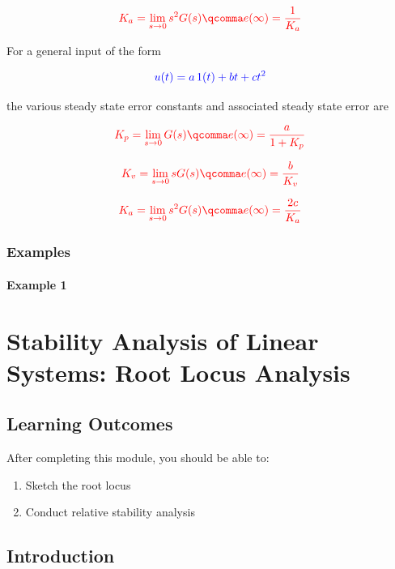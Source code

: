 \documentclass[
  14pt,
  a4paper,
  oneside,
  open=any,
  a4paper,
  14pt]{report}
\begin{document}
\[
    \textcolor{red}{K_a = \lim_{s \to 0} s^2G(s)\qcomma e(\infty) = \dfrac{1}{K_a}}
\]

For a general input of the form

\[
    \textcolor{blue}{u(t) = a\, 1(t) + bt + ct^2}
\]

the various steady state error constants and associated steady state
error are

\[
    \textcolor{red}{K_p = \lim_{s \to 0} G(s)\qcomma e(\infty) = \dfrac{a}{1+K_p}}
\]

\[
    \textcolor{red}{K_v = \lim_{s \to 0} sG(s)\qcomma e(\infty) = \dfrac{b}{K_v}}
\]

\[
    \textcolor{red}{K_a = \lim_{s \to 0} s^2G(s)\qcomma e(\infty) = \dfrac{2c}{K_a}}
\]

\subsection{Examples}\label{examples-1}

\subsubsection{Example 1}\label{example-1-4}

\chapter{Stability Analysis of Linear Systems: Root Locus
Analysis}\label{stability-analysis-of-linear-systems-root-locus-analysis}

\section*{Learning Outcomes}\label{learning-outcomes-6}


After completing this module, you should be able to:

\begin{enumerate}
\def\labelenumi{\arabic{enumi}.}
\item
  Sketch the root locus
\item
  Conduct relative stability analysis
\end{enumerate}

\section{Introduction}\label{introduction-5}
\end{document}

